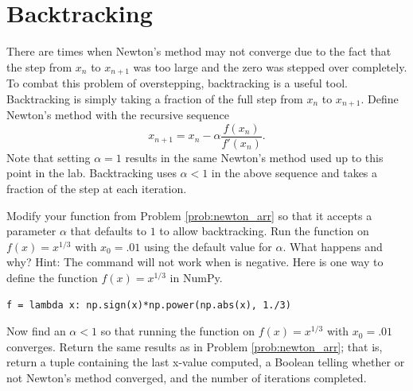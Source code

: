 \section*{Backtracking}
There are times when Newton's method may not converge due to the fact that the step from $x_n$ to $x_{n+1}$ was too large and the zero was stepped over completely. %
To combat this problem of overstepping, backtracking is a useful tool.  Backtracking is simply taking a fraction of the full step from $x_n$ to $x_{n+1}$.  Define Newton's method with the recursive sequence
\[
x_{n+1} = x_n - \alpha\frac{f(x_n)}{f'(x_n)}.
\]
Note that setting $\alpha = 1$ results in the same Newton's method used up to this point in the lab.  Backtracking uses $\alpha < 1$ in the above sequence and takes a fraction of the step at each iteration.

\begin{problem}
Modify your function from Problem \ref{prob:newton_arr} so that it accepts a parameter $\alpha$ that defaults to $1$ to allow backtracking.
Run the function on $f(x)=x^{1/3}$ with $x_0=.01$ using the default value for $\alpha$.
What happens and why?
Hint: The command  will not work when  is negative.
Here is one way to define the function $f(x)=x^{1/3}$ in NumPy.
\begin{lstlisting}
f = lambda x: np.sign(x)*np.power(np.abs(x), 1./3)
\end{lstlisting}
Now find an $\alpha < 1$ so that running the function on $f(x)=x^{1/3}$ with $x_0=.01$ converges.
Return the same results as in Problem \ref{prob:newton_arr}; that is, return a tuple containing the last x-value computed, a Boolean telling whether or not Newton's method converged, and the number of iterations completed.
\end{problem}

